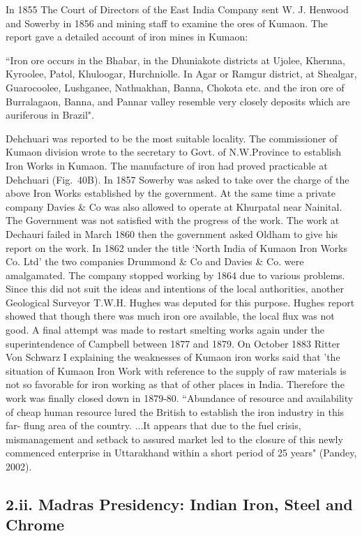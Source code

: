In 1855 The Court of Directors of the East India Company sent W. J. Henwood and Sowerby in 1856 and mining staff to examine the ores of Kumaon. The report gave a detailed account of iron mines in Kumaon:

``Iron ore occurs in the Bhabar, in the Dhuniakote districts at Ujolee, Khernna, Kyroolee, Patol, Khuloogar, Hurchniolle. In Agar or Ramgur district, at Shealgar, Guarocoolee, Lushganee, Nathuakhan, Banna, Chokota etc. and the iron ore of Burralagaon, Banna, and Pannar valley resemble very closely deposits which are auriferous in Brazil".

Dehchuari was reported to be the most suitable locality. The commissioner of Kumaon division wrote to the secretary to Govt. of N.W.Province to establish Iron Works in Kumaon. The manufacture of iron had proved practicable at Dehchuari (Fig.~40B). In 1857 Sowerby was asked to take over the charge of the above Iron Works established by the government. At the same time a private company Davies \& Co was also allowed to operate at Khurpatal near Nainital. The Government was not satisfied with the progress of the work. The work at Dechauri failed in March 1860 then the government asked Oldham to give his report on the work. In 1862 under the title `North India of Kumaon Iron Works Co. Ltd' the two companies Drummond \& Co and Davies \& Co. were amalgamated. The company stopped working by 1864 due to various problems. Since this did not suit the ideas and intentions of the local authorities, another Geological Surveyor T.W.H. Hughes was deputed for this purpose. Hughes report showed that though there was much iron ore available, the local flux was not good. A final attempt was made to restart smelting works again under the superintendence of Campbell between 1877 and 1879. On October 1883 Ritter Von Schwarz I explaining the weaknesses of Kumaon iron works said that 'the situation of Kumaon Iron Work with reference to the supply of raw materials is not so favorable for iron working as that of other places in India. Therefore the work was finally closed down in 1879-80. ``Abundance of resource and availability of cheap human resource lured the British to establish the iron industry in this far- flung area of the country. ...It appears that due to the fuel crisis, mismanagement and setback to assured market led to the closure of this newly commenced enterprise in Uttarakhand within a short period of 25 years" (Pandey, 2002).

\subsection*{2.ii.  Madras Presidency: Indian Iron, Steel and Chrome}

